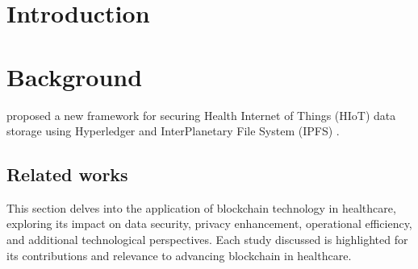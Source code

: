 \documentclass[cic,tc,english]{iiufrgs}
\begin{document}
\begin{translatedabstract}
    
\end{translatedabstract}

\listoffigures

\listoftables

\listofalgorithms





\tableofcontents

\chapter{Introduction}
    

\chapter{Background}
    \label{background}
    \citet{laura2023} proposed a new framework for securing Health Internet of Things (HIoT) data storage using Hyperledger and InterPlanetary File System (IPFS) \cite{benet2013ipfs}.

\section{Related works}
\label{relatedworks}


    This section delves into the application of blockchain technology in healthcare, exploring its impact on data security, privacy enhancement, operational efficiency, and additional technological perspectives. Each study discussed is highlighted for its contributions and relevance to advancing blockchain in healthcare.



    
\end{document}
